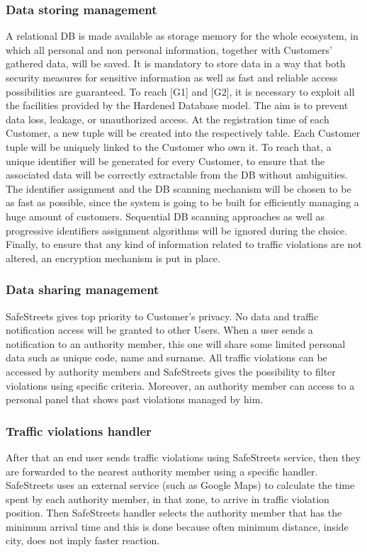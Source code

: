 \documentclass[12pt]{article}
\begin{document}
\subsubsection{Data storing management}
\vspace{5mm}
A relational DB is made available as storage memory for the whole ecosystem, in which all personal and non personal information, together with Customers’ gathered data, will be saved. It is mandatory to store data in a way that both security measures for sensitive information as well as fast and reliable access possibilities are guaranteed. To reach [G1] and [G2], it is necessary to exploit all the facilities provided by the Hardened Database model. The aim is to prevent data loss, leakage, or unauthorized access. At the registration time of each Customer, a new tuple will be created into the respectively table. Each Customer tuple will be uniquely linked to the Customer who own it. To reach that, a unique identifier will be generated for every Customer, to ensure that the associated data will be correctly extractable from the DB without ambiguities. The identifier assignment and the DB scanning mechanism will be chosen to be as fast as possible, since the system is going to be built for efficiently managing a huge amount of customers. Sequential DB scanning approaches as well as progressive identifiers assignment algorithms will be ignored during the choice. Finally, to ensure that any kind of information related to traffic violations are not altered, an encryption mechanism is put in place.

\subsubsection{Data sharing management}
\vspace{2mm}
SafeStreets gives top priority to Customer’s privacy. No data and traffic  notification access will be granted to other Users. When a user sends a notification to an authority member, this one will share some limited personal data such as unique code, name and surname. All traffic violations can be accessed by authority members and SafeStreets gives the possibility to filter violations using specific criteria. Moreover, an authority member can access to a personal panel that shows past violations managed by him. 

\subsubsection{Traffic violations handler}
\vspace{2mm}
After that an end user sends traffic violations using SafeStreets service, then they are forwarded to the nearest authority member using a specific handler. SafeStreets uses an external service (such as Google Maps) to calculate the time spent by each authority member, in that zone, to arrive in traffic violation position. Then SafeStreets handler selects the authority member that has the minimum arrival time and this is done because often minimum distance, inside city, does not imply faster reaction.
\end{document}
